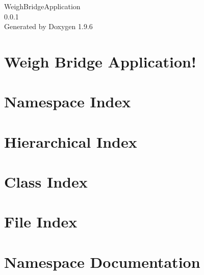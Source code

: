\documentclass[twoside]{book}
\newcommand{\+}{\discretionary{\mbox{\scriptsize$\hookleftarrow$}}{}{}}
\newcommand{\clearemptydoublepage}{%
    \newpage{\pagestyle{empty}\cleardoublepage}%
  }
\begin{document}
  \raggedbottom
    \hypersetup{pageanchor=false,
                bookmarksnumbered=true,
                pdfencoding=unicode
               }
  \begin{titlepage}
  \vspace*{7cm}
  \begin{center}%
  {\Large Weigh\+Bridge\+Application}\\
  [1ex]\large 0.\+0.\+1 \\
  \vspace*{1cm}
  {\large Generated by Doxygen 1.9.6}\\
  \end{center}
  \end{titlepage}
  \clearemptydoublepage
  \tableofcontents
  \clearemptydoublepage
  \hypersetup{pageanchor=true}
\chapter{Weigh Bridge Application!}
\label{md_readme}

\chapter{Namespace Index}

\chapter{Hierarchical Index}

\chapter{Class Index}

\chapter{File Index}

\chapter{Namespace Documentation}

\end{document}
